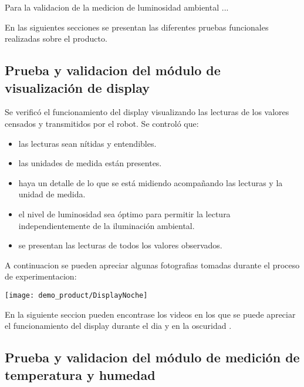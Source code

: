 Para la validacion de la medicion de luminosidad ambiental ...

En las siguientes secciones se presentan las diferentes pruebas funcionales realizadas sobre el producto.



\subsection{Prueba y validacion del módulo de visualización de display}

Se verificó el funcionamiento del display visualizando las lecturas de los valores censados y transmitidos por el robot. Se controló que:

\begin{itemize}
	\item las lecturas sean nítidas y entendibles.
	\item las unidades de medida están presentes.
	\item haya un detalle de lo que se está midiendo acompañando las lecturas y la unidad de medida.
	\item el nivel de luminosidad sea óptimo para permitir la lectura independientemente de la iluminación ambiental.
	\item se presentan las lecturas de todos los valores observados.
\end{itemize}


A continuacion se pueden apreciar algunas fotografias tomadas durante el proceso de experimentacion:

\begin{center}
 \texttt{[image: demo\_product/DisplayNoche]}
   \label{fig:DisplayNoche}
\end{center}


En la siguiente seccion pueden encontrase los videos en los que se puede apreciar el funcionamiento del display durante el dia \cite{Demo_Mediciones} y en la oscuridad \cite{Demo_Display_Oscuridad}.

\subsection{Prueba y validacion del módulo de medición de temperatura y humedad}

